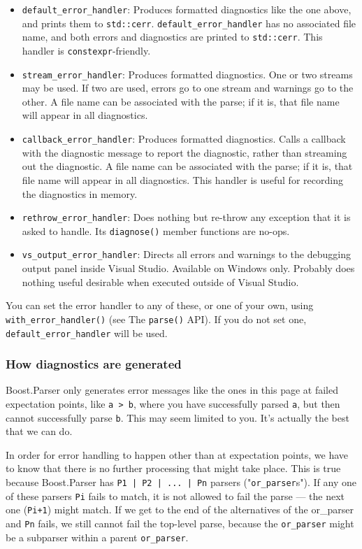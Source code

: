 \begin{itemize}
\item
  \texttt{default\_error\_handler}: Produces formatted diagnostics like the one above, and prints them to \texttt{std::cerr}. \texttt{default\_error\_handler} has no associated file name, and both errors and diagnostics are printed to \texttt{std::cerr}. This handler is \texttt{constexpr}-friendly.
\item
  \texttt{stream\_error\_handler}: Produces formatted diagnostics. One or two streams may be used. If two are used, errors go to one stream and warnings go to the other. A file name can be associated with the parse; if it is, that file name will appear in all diagnostics.
\item
  \texttt{callback\_error\_handler}: Produces formatted diagnostics. Calls a callback with the diagnostic message to report the diagnostic, rather than streaming out the diagnostic. A file name can be associated with the parse; if it is, that file name will appear in all diagnostics. This handler is useful for recording the diagnostics in memory.
\item
  \texttt{rethrow\_error\_handler}: Does nothing but re-throw any exception that it is asked to handle. Its \texttt{diagnose()} member functions are no-ops.
\item
  \texttt{vs\_output\_error\_handler}: Directs all errors and warnings to the debugging output panel inside Visual Studio. Available on Windows only. Probably does nothing useful desirable when executed outside of Visual Studio.
\end{itemize}

You can set the error handler to any of these, or one of your own, using \texttt{with\_error\_handler()} (see The \texttt{parse()} API). If you do not set one, \texttt{default\_error\_handler} will be used.

\subsubsection{How diagnostics are generated}

Boost.Parser only generates error messages like the ones in this page at failed expectation points, like \texttt{a > b}, where you have successfully parsed \texttt{a}, but then cannot successfully parse \texttt{b}. This may seem limited to you. It's actually the best that we can do.

In order for error handling to happen other than at expectation points, we have to know that there is no further processing that might take place. This is true because Boost.Parser has \texttt{P1 | P2 | ... | Pn} parsers ("\texttt{or\_parser}s"). If any one of these parsers \texttt{Pi} fails to match, it is not allowed to fail the parse --- the next one (\texttt{Pi+1}) might match. If we get to the end of the alternatives of the or\_parser and \texttt{Pn} fails, we still cannot fail the top-level parse, because the \texttt{or\_parser} might be a subparser within a parent \texttt{or\_parser}.

